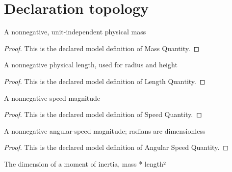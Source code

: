 \section{Declaration topology}
\begin{definition}
  \label{def:physics:phyx-mini-0787:phyxminiproblems-problemphyxmini0787-massquantity}
  A nonnegative, unit-independent physical mass
\end{definition}
\begin{proof}
  This is the declared model definition of Mass Quantity.
\end{proof}
\begin{definition}
  \label{def:physics:phyx-mini-0787:phyxminiproblems-problemphyxmini0787-lengthquantity}
  A nonnegative physical length, used for radius and height
\end{definition}
\begin{proof}
  This is the declared model definition of Length Quantity.
\end{proof}
\begin{definition}
  \label{def:physics:phyx-mini-0787:phyxminiproblems-problemphyxmini0787-speedquantity}
  A nonnegative speed magnitude
\end{definition}
\begin{proof}
  This is the declared model definition of Speed Quantity.
\end{proof}
\begin{definition}
  \label{def:physics:phyx-mini-0787:phyxminiproblems-problemphyxmini0787-angularspeedquantity}
  A nonnegative angular-speed magnitude; radians are dimensionless
\end{definition}
\begin{proof}
  This is the declared model definition of Angular Speed Quantity.
\end{proof}
\begin{definition}
  \label{def:physics:phyx-mini-0787:phyxminiproblems-problemphyxmini0787-momentofinertiadimension}
  The dimension of a moment of inertia, mass * length²
\end{definition}
